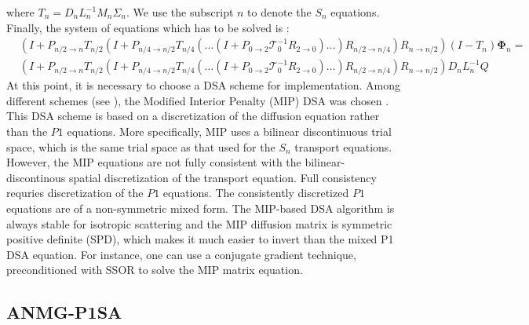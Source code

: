 \documentclass[preprint,10pt]{elsarticle}
\newcommand\bs{\boldsymbol}
\renewcommand{\(}{\left(}
\renewcommand{\)}{\right)}
\renewcommand{\[}{\left[}
\renewcommand{\]}{\right]}
\begin{document}
%
where $T_n = D_n L_n^{-1}M_n \Sigma_n$. We use the subscript $n$ to denote 
the $S_n$ equations.\\
Finally, the system of equations which has to be solved is :
\begin{equation}
\begin{split}
&(I+P_{{n}/{2}\rightarrow n }
T_{{n}/{2}} (I+P_{{n}/{4}\rightarrow {n}/{2}}T_{{n}/{4}} (\hdots
(I+P_{0\rightarrow 2} \mathcal{T}_0^{-1} R_{2\rightarrow 0})\hdots)
R_{{n}/{2}\rightarrow {n}/{4}})R_{n\rightarrow{n}/{2}})(I-T_n)
\bs{\Phi}_n =\\
& (I+P_{{n}/{2}\rightarrow n} T_{{n}/{2}} (I+P_{{n}/{4}
\rightarrow {n}/{2}} T_{{n}/{4}} (\hdots (I+P_{0 \rightarrow
2}\mathcal{T}_0^{-1} R_{2\rightarrow 0})\hdots)R_{{n}/{2}\rightarrow
{n}/{4}})R_{n\rightarrow {n}/{2}} ) D_n L_n^{-1} Q
\end{split}
\label{anmg-dsa}
\end{equation}  
%
At this point, it is necessary to choose a DSA scheme for implementation. Among different
schemes (see \cite{adams}), the Modified Interior Penalty (MIP) DSA was
chosen \cite{mip}. This DSA scheme is based on a discretization of the diffusion equation 
rather than the $P1$ equations.  More specifically, MIP uses a bilinear discontinuous trial space, which is
the same trial space as that used for the $S_n$ transport equations.  However, the MIP equations are not 
fully consistent with the bilinear-discontinous spatial discretization of the transport equation.  Full 
consistency requries discretization of the $P1$ equations.  The consistently discretized $P1$ equations are of a 
non-symmetric mixed form.  The MIP-based DSA algorithm is always stable for isotropic scattering and the MIP 
diffusion matrix is symmetric positive definite (SPD), which makes it much easier to invert than the mixed P1 DSA 
equation.  For instance, one can use a conjugate gradient technique, preconditioned with SSOR to solve the MIP 
matrix equation.

\subsection{ANMG-P1SA}
\end{document}
